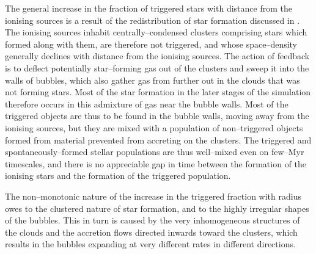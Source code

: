 \documentclass[useAMS,usenatbib,usegraphicx]{mn2e}
\begin{document}
The general increase in the fraction of triggered stars with distance from the ionising sources is a result of the redistribution of star formation discussed in \cite{Dale13b}. The ionising sources inhabit centrally--condensed clusters comprising stars which formed along with them, are therefore not triggered, and whose space--density generally declines with distance from the ionising sources. The action of feedback is to deflect potentially star--forming gas out of the clusters and sweep it into the walls of bubbles, which also gather gas from further out in the clouds that was not forming stars. Most of the star formation in the later stages of the simulation therefore occurs in this admixture of gas near the bubble walls. Most of the triggered objects are thus to be found in the bubble walls, moving away from the ionising sources, but they are mixed with a population of non--triggered objects formed from material prevented from accreting on the clusters. The triggered and spontaneously--formed stellar populations are thus well--mixed even on few--Myr timescales, and there is no appreciable gap in time between the formation of the ionising stars and the formation of the triggered population. 

The non--monotonic nature of the increase in the triggered fraction with radius owes to the clustered nature of star formation, and to the highly irregular shapes of the bubbles. This in turn is caused by the very inhomogeneous structures of the clouds and the accretion flows directed inwards toward the clusters, which results in the bubbles expanding at very different rates in different directions.
\end{document}
